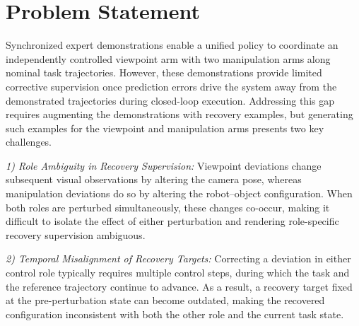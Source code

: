 \documentclass[letterpaper, 10 pt, conference]{ieeeconf}  %
\begin{document}



\section{Problem Statement}
\label{sec:problem_statement}

Synchronized expert demonstrations enable a unified policy to coordinate an independently controlled viewpoint arm with two manipulation arms along nominal task trajectories. However, these demonstrations provide limited corrective supervision once prediction errors drive the system away from the demonstrated trajectories during closed-loop execution. Addressing this gap requires augmenting the demonstrations with recovery examples, but generating such examples for the viewpoint and manipulation arms presents two key challenges.

\textit{1) Role Ambiguity in Recovery Supervision:}
Viewpoint deviations change subsequent visual observations by altering the camera pose, whereas manipulation deviations do so by altering the robot--object configuration. When both roles are perturbed simultaneously, these changes co-occur, making it difficult to isolate the effect of either perturbation and rendering role-specific recovery supervision ambiguous.

\textit{2) Temporal Misalignment of Recovery Targets:}
Correcting a deviation in either control role typically requires multiple control steps, during which the task and the reference trajectory continue to advance. As a result, a recovery target fixed at the pre-perturbation state can become outdated, making the recovered configuration inconsistent with both the other role and the current task state.
\end{document}
